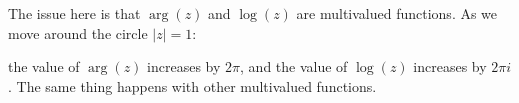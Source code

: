 The issue here is that $\arg(z)$ and $\log(z)$ are multivalued functions. As we move around the circle $|z| = 1$:

\begin{center}
\end{center}

\noin the value of $\arg(z)$ increases by $2\pi$, and the value of $\log(z)$ increases by $2\pi i$. The same thing happens with other multivalued functions.

